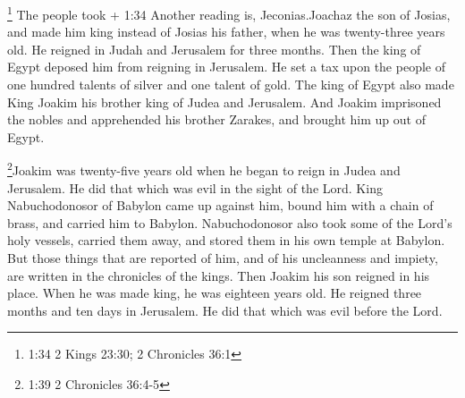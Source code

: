  \footnote{1:34 2 Kings 23:30; 2 Chronicles 36:1} The
people took + 1:34 Another reading is, Jeconias.Joachaz the son of
Josias, and made him king instead of Josias his father, when he was
twenty-three years old.  He reigned in Judah and Jerusalem
for three months. Then the king of Egypt deposed him from reigning in
Jerusalem.  He set a tax upon the people of one hundred
talents of silver and one talent of gold.  The king of
Egypt also made King Joakim his brother king of Judea and Jerusalem.
 And Joakim imprisoned the nobles and apprehended his
brother Zarakes, and brought him up out of Egypt.

 \footnote{1:39 2 Chronicles 36:4-5}Joakim was twenty-five
years old when he began to reign in Judea and Jerusalem. He did that
which was evil in the sight of the Lord.  King
Nabuchodonosor of Babylon came up against him, bound him with a chain of
brass, and carried him to Babylon.  Nabuchodonosor also
took some of the Lord's holy vessels, carried them away, and stored them
in his own temple at Babylon.  But those things that are
reported of him, and of his uncleanness and impiety, are written in the
chronicles of the kings.  Then Joakim his son reigned in
his place. When he was made king, he was eighteen years old.
 He reigned three months and ten days in Jerusalem. He did
that which was evil before the Lord.

